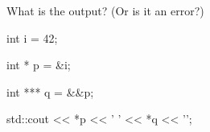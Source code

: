 What is the output? (Or is it an error?)



\begin{consolethree}[escapeinside=||]

int i = 42;

int * p = &i;

int *** q = &&p;



std::cout << *p << ' ' << *q << '\n'; 

\end{consolethree}

